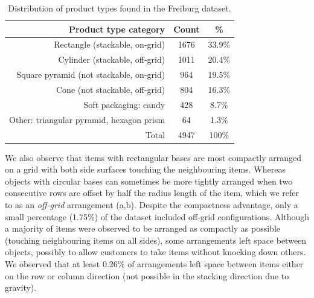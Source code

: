\begin{table}[h]
	\centering
	\caption{Distribution of product types found in the Freiburg dataset.}
	\label{table:typesdistribution}
	\begin{tabular}{r|cc}
		Product type category&Count& \% \\ \hline
		Rectangle (stackable, on-grid) &1676&33.9\% \\
		Cylinder (stackable, off-grid) &1011&20.4\% \\
		Square pyramid (not stackable, on-grid) &964&19.5\% \\
		Cone (not stackable, off-grid)&804&16.3\% \\
		Soft packaging: \eg candy &428&8.7\% \\
		Other: \eg triangular pyramid, hexagon prism &64&1.3\% \\ \hline
		Total &4947&100\%
	\end{tabular}
\end{table}

We also observe that items with rectangular bases are most compactly arranged on a grid with both side surfaces touching the neighbouring items.
Whereas objects with circular bases can sometimes be more tightly arranged when two consecutive rows are offset by half the radius length of the item, which we refer to as an {\em off-grid} arrangement (a,b).
Despite the compactness advantage, only a small percentage (1.75\%) of the dataset included off-grid configurations.
Although a majority of items were observed to be arranged as compactly as possible (touching neighbouring items on all sides), some arrangements left space between objects, possibly to allow customers to take items without knocking down others.
We observed that at least 0.26\% of arrangements left space between items either on the row or column direction (not possible in the stacking direction due to gravity).

